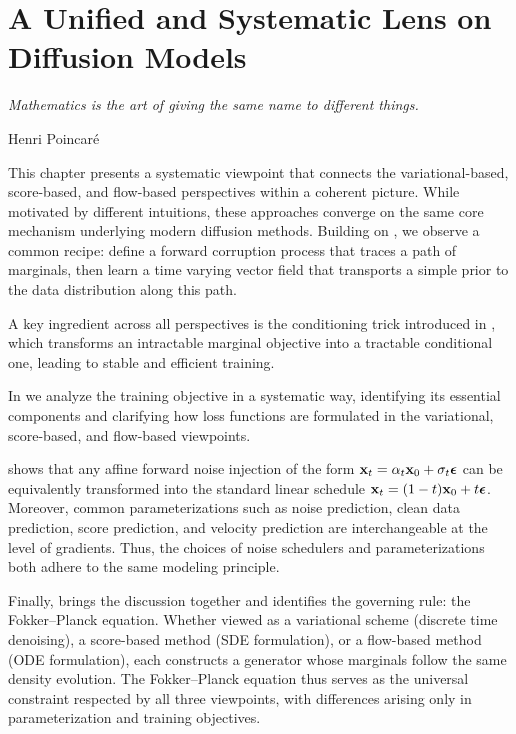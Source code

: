 \chapter{A Unified and Systematic Lens on Diffusion Models}\label{ch:all-equivalent} 

\epigraph{
    \textit{Mathematics is the art of giving the same name to different things.
}}{Henri Poincaré}

This chapter presents a systematic viewpoint that connects the variational-based, score-based, and flow-based perspectives within a coherent picture. While motivated by different intuitions, these approaches converge on the same core mechanism underlying modern diffusion methods. Building on , we observe a common recipe: define a forward corruption process that traces a path of marginals, then learn a time varying vector field that transports a simple prior to the data distribution along this path.

A key ingredient across all perspectives is the conditioning trick introduced in , which transforms an intractable marginal objective into a tractable conditional one, leading to stable and efficient training.

In  we analyze the training objective in a systematic way, identifying its essential components and clarifying how loss functions are formulated in the variational, score-based, and flow-based viewpoints.


 shows that any affine forward noise injection of the form ${\mathbf{x}}_t = \alpha_t {\mathbf{x}}_0 + \sigma_t {\bm{\epsilon}}$ can be equivalently transformed into the standard linear schedule ${\mathbf{x}}_t = (1 - t){\mathbf{x}}_0 + t{\bm{\epsilon}}$. Moreover, common parameterizations such as noise prediction, clean data prediction, score prediction, and velocity prediction are interchangeable at the level of gradients. Thus, the choices of noise schedulers and parameterizations both adhere to the same  modeling principle.



Finally,  brings the discussion together and identifies the governing rule: the Fokker–Planck equation. Whether viewed as a variational scheme (discrete time denoising), a score-based method (SDE formulation), or a flow-based method (ODE formulation), each constructs a generator whose marginals follow the same density evolution. The Fokker–Planck equation thus serves as the universal constraint respected by all three viewpoints, with differences arising only in parameterization and training objectives.



